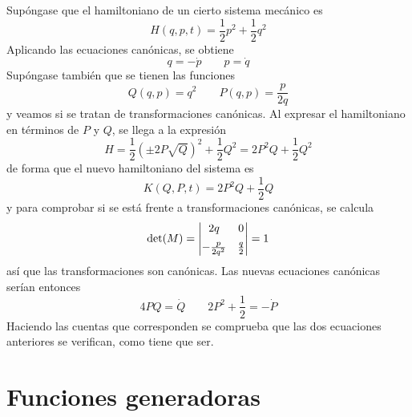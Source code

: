 \documentclass[12pt]{report}
\begin{document}
\begin{example}
Supóngase que el hamiltoniano de un cierto sistema mecánico es
\[H(q,p,t) = \frac{1}{2}p^2+\frac{1}{2}q^2\]
Aplicando las ecuaciones canónicas, se obtiene
\[q = -\dot{p} \qquad p = \dot{q} \]
Supóngase también que se tienen las funciones
\[Q(q,p) = q^2 \qquad P(q,p) = \frac{p}{2q}\]
y veamos si se tratan de transformaciones canónicas. Al expresar el hamiltoniano en términos de $P$ y $Q$, se llega a la expresión
\[H = \frac{1}{2}(\pm 2P\sqrt{Q})^2+\frac{1}{2}Q^2 = 2P^2Q+\frac{1}{2}Q^2\]
de forma que el nuevo hamiltoniano del sistema es
\[K(Q,P,t) = 2P^2Q+\frac{1}{2}Q\]
y para comprobar si se está frente a transformaciones canónicas, se calcula
\[\textup{det}(M) = \begin{vmatrix}
    2q & 0 \\[5pt]
    -\frac{p}{2q^2} & \frac{q}{2}
\end{vmatrix} = 1\]
así que las transformaciones son canónicas. Las nuevas ecuaciones canónicas serían entonces
\[4PQ = \dot{Q} \qquad 2P^2+\frac{1}{2} = -\dot{P}\]
Haciendo las cuentas que corresponden se comprueba que las dos ecuaciones anteriores se verifican, como tiene que ser.
\end{example}

\section{Funciones generadoras}
\end{document}
